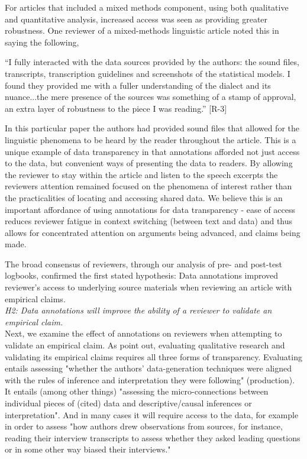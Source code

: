 \documentclass[sigchi]{acmart}
\begin{document}
For articles that included a mixed methods component, using both qualitative and quantitative analysis, increased access was seen as providing greater robustness. One reviewer of a mixed-methods linguistic article noted this in saying the following, 
\begin{displayquote}
“I fully interacted with the data sources provided by the authors: the sound files, transcripts, transcription guidelines and screenshots of the statistical models. I found they provided me with a fuller understanding of the dialect and its nuance...the mere presence of the sources was something of a stamp of approval, an extra layer of robustness to the piece I was reading.” [R-3]
\end{displayquote}
In this particular paper the authors had provided sound files that allowed for the linguistic phenomena to be heard by the reader throughout the article. This is a unique example of data transparency in that annotations afforded not just access to the data, but convenient ways of presenting the data to readers. By allowing the reviewer to stay within the article and listen to the speech excerpts the reviewers attention remained focused on the phenomena of interest rather than the practicalities of locating and accessing shared data. We believe this is an important affordance of using annotations for data transparency - ease of access reduces reviewer fatigue in context switching (between text and data) and thus allows for concentrated attention on arguments being advanced, and claims being made. 

The broad consensus of reviewers, through our analysis of pre- and post-test logbooks, confirmed the first stated hypothesis: Data annotations improved reviewer’s access to underlying source materials when reviewing an article with empirical claims.\\ 

\textit{H2: Data annotations will improve the ability of a reviewer to validate an empirical claim.}\\

Next, we examine the effect of annotations on reviewers when attempting to validate an empirical claim. As \citet[45-46]{elman2014data} point out, evaluating qualitative research and validating its empirical claims requires all three forms of transparency. Evaluating entails assessing "whether the authors’ data-generation techniques were aligned with the rules of inference and interpretation they were following" (production). It entails (among other things) "assessing the micro-connections between individual pieces of (cited) data and descriptive/causal inferences or interpretation". And in many cases it will require access to the data, for example in order to assess "how authors drew observations from sources, for instance, reading their interview transcripts to assess whether they asked leading questions or in some other way biased their interviews." \cite{elman2014data}
\end{document}
